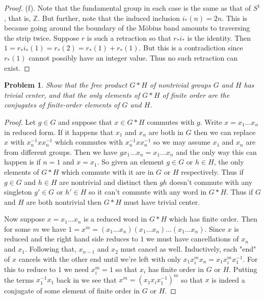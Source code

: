 \documentclass{article}
\newtheorem{problem}{Problem}
\begin{document}
\begin{proof}
(f). Note that the fundamental group in each case is the same as that of $S^1$, that is, $\mathbb{Z}$. But further, note that the induced inclusion $i_*(n) = 2n$. This is because going around the boundary of the M\"{o}bius band amounts to traversing the strip twice. Suppose $r$ is such a retraction so that $r_*i_*$ is the identity. Then $1 = r_*i_*(1) = r_*(2) = r_*(1) + r_*(1)$.  But this is a contradiction since $r_*(1)$ cannot possibly have an integer value. Thus no such retraction can exist.
\end{proof}

\begin{problem}
Show that the free product $G*H$ of nontrivial groups $G$ and $H$ has trivial center, and that the only elements of $G*H$ of finite order are the conjugates of finite-order elements of $G$ and $H$.
\end{problem}
\begin{proof}
Let $g \in G$ and suppose that $x \in G*H$ commutes with $g$. Write $x = x_1 \dots x_n$ in reduced form. If it happens that $x_1$ and $x_n$ are both in $G$ then we can replace $x$ with $x_n^{-1}xx_n^{-1}$ which commutes with $x_n^{-1}xx_n^{-1}$ so we may assume $x_1$ and $x_n$ are from different groups. Then we have $gx_1 \dots x_n = x_1 \dots x_n$ and the only way this can happen is if $n = 1$ and $x = x_1$. So given an element $g \in G$ or $h \in H$, the only elements of $G*H$ which commute with it are in $G$ or $H$ respectively. Thus if $g \in G$ and $h \in H$ are nontrivial and distinct then $gh$ doesn't commute with any singleton $g' \in G$ or $h' \in H$ so it can't commute with any word in $G*H$. Thus if $G$ and $H$ are both nontrivial then $G*H$ must have trivial center.

Now suppose $x = x_1 \dots x_n$ is a reduced word in $G*H$ which has finite order. Then for some $m$ we have $1 = x^m = (x_1 \dots x_n)(x_1 \dots x_n) \dots (x_1 \dots x_n)$. Since $x$ is reduced and the right hand side reduces to $1$ we must have cancellations of $x_n$ and $x_1$. Following that, $x_{n-1}$ and $x_2$ must cancel as well. Inductively, each "end" of $x$ cancels with the other end until we're left with only $x_1x_i^mx_n = x_1x_i^mx_1^{-1}$. For this to reduce to $1$ we need $x_i^m = 1$ so that $x_i$ has finite order in $G$ or $H$. Putting the terms $x_1^{-1}x_1$ back in we see that $x^m = (x_1x_ix_1^{-1})^m$ so that $x$ is indeed a conjugate of some element of finite order in $G$ or $H$.
\end{proof}
\end{document}

